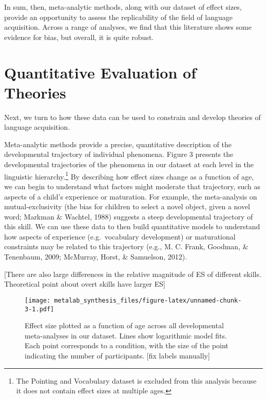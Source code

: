 \documentclass[english,floatsintext,man]{apa6}
\begin{document}
In sum, then, meta-analytic methods, along with our dataset of effect
sizes, provide an opportunity to assess the replicability of the field
of language acquisition. Across a range of analyses, we find that this
literature shows some evidence for bias, but overall, it is quite
robust.

\section{Quantitative Evaluation of
Theories}\label{quantitative-evaluation-of-theories}

Next, we turn to how these data can be used to constrain and develop
theories of language acquisition.

Meta-analytic methods provide a precise, quantitative description of the
developmental trajectory of individual phenomena. Figure 3 presents the
developmental trajectories of the phenomena in our dataset at each level
in the linguistic
hierarchy.\footnote{The Pointing and Vocabulary dataset is excluded from this analysis because it does not contain effect sizes at multiple ages.}
By describing how effect sizes change as a function of age, we can begin
to understand what factors might moderate that trajectory, such as
aspects of a child's experience or maturation. For example, the
meta-analysis on mutual-exclusivity (the bias for children to select a
novel object, given a novel word; Markman \& Wachtel, 1988) suggests a
steep developmental trajectory of this skill. We can use these data to
then build quantitative models to understand how aspects of experience
(e.g.~vocabulary development) or maturational constraints may be related
to this trajectory (e.g., M. C. Frank, Goodman, \& Tenenbaum, 2009;
McMurray, Horst, \& Samuelson, 2012).

{[}There are also large differences in the relative magnitude of ES of
different skills. Theoretical point about overt skills have larger ES{]}

\begin{figure}[htbp]
\centering
\texttt{[image: metalab\_synthesis\_files/figure-latex/unnamed-chunk-3-1.pdf]}
\caption{Effect size plotted as a function of age across all
developmental meta-analyses in our dataset. Lines show logarithmic model
fits. Each point corresponds to a condition, with the size of the point
indicating the number of participants. {[}fix labels manually{]}}
\end{figure}
\end{document}
